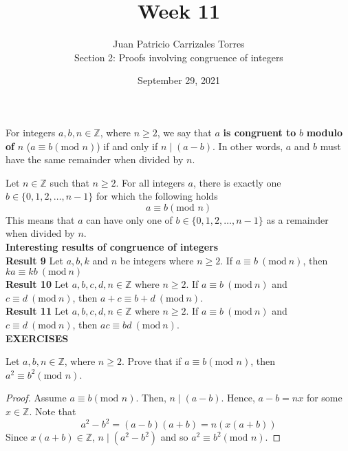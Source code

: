\documentclass[12pt]{article}
\newcommand{\Z}{\mathbb{Z}}
\newcommand{\Mod}[1]{\ (\mathrm{mod}\ #1)}
\newenvironment{problem}[2][Problem]{\begin{trivlist}
		\item[\hskip \labelsep {\bfseries #1}\hskip \labelsep {\bfseries #2.}]}{\end{trivlist}}
\begin{document}
	
	\title{Week 11}
	\author{Juan Patricio Carrizales Torres \\
		Section 2: Proofs involving congruence of integers}
	\date{September 29, 2021}
	\maketitle
	
	For integers $a,b,n\in \Z$, where $n\geq 2$, we say that $a$ \textbf{is congruent to }$b$ \textbf{modulo of }$n$ ($a \equiv b (\text{mod }n)$) if and only if $n\mid (a-b)$. In other words, $a$ and $b$ must have the same remainder when divided by $n$. 
	
	Let $n\in \Z$ such that $n\geq 2$. For all integers $a$, there is exactly one $b \in \{0,1,2,\ldots, n-1\}$ for which the following holds
	\begin{equation*}
		a\equiv b (\text{mod }n) 
	\end{equation*} 
	This means that $a$ can have only one of $b \in \{0,1,2,\ldots, n-1\}$ as a remainder when divided by $n$.\\
	
	\textbf{Interesting results of congruence of integers}\\
	
	\textbf{Result 9} Let $a,b,k$ and $n$ be integers where $n\geq 2$. If $a \equiv b \Mod n$, then $ka \equiv kb \Mod n$\\
	\textbf{Result 10} Let $a,b,c,d,n\in \Z$ where $n\geq 2$. If $a\equiv b \Mod n$ and $c\equiv d \Mod n$, then $a+c \equiv b+d \Mod n$.\\
	\textbf{Result 11} Let $a,b,c,d,n \in \Z$ where $n\geq 2$. If $a\equiv b \Mod n$ and $c\equiv d \Mod n$, then $ac \equiv bd \Mod n$. \\
	
	\textbf{EXERCISES}\\
	
	\begin{problem}{14}
		Let $a,b,n\in \Z$, where $n\geq 2$. Prove that if $a \equiv b (\text{mod }n)$, then $a^{2}\equiv b^{2} (\text{mod }n)$.
		\begin{proof}
			Assume $a\equiv b (\text{mod }n)$. Then, $n\mid (a-b)$. Hence, $a-b=nx$ for some $x\in \Z$. Note that
			\begin{equation*}
				a^{2}-b^{2}=(a-b)(a+b)=n(x(a+b))
			\end{equation*}
		Since $x(a+b)\in \Z$, $n\mid (a^{2}-b^{2})$ and so $a^{2}\equiv b^{2} (\text{mod }n)$.
		\end{proof}
	\end{problem}
\end{document}
